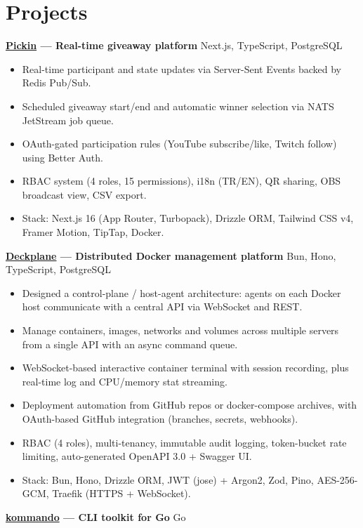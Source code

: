 \documentclass[10pt,a4paper]{extarticle}
\begin{document}
\section{Projects}
\noindent\textbf{\href{https://pickin.co}{Pickin} — Real-time giveaway platform} \hfill Next.js, TypeScript, PostgreSQL\\
\begin{itemize}[leftmargin=*,noitemsep,topsep=0pt]
    \item Real-time participant and state updates via Server-Sent Events backed by Redis Pub/Sub.
    \item Scheduled giveaway start/end and automatic winner selection via NATS JetStream job queue.
    \item OAuth-gated participation rules (YouTube subscribe/like, Twitch follow) using Better Auth.
    \item RBAC system (4 roles, 15 permissions), i18n (TR/EN), QR sharing, OBS broadcast view, CSV export.
    \item Stack: Next.js 16 (App Router, Turbopack), Drizzle ORM, Tailwind CSS v4, Framer Motion, TipTap, Docker.
\end{itemize}
\noindent\textbf{\href{https://deckplane.com}{Deckplane} — Distributed Docker management platform} \hfill Bun, Hono, TypeScript, PostgreSQL\\
\begin{itemize}[leftmargin=*,noitemsep,topsep=0pt]
    \item Designed a control-plane / host-agent architecture: agents on each Docker host communicate with a central API via WebSocket and REST.
    \item Manage containers, images, networks and volumes across multiple servers from a single API with an async command queue.
    \item WebSocket-based interactive container terminal with session recording, plus real-time log and CPU/memory stat streaming.
    \item Deployment automation from GitHub repos or docker-compose archives, with OAuth-based GitHub integration (branches, secrets, webhooks).
    \item RBAC (4 roles), multi-tenancy, immutable audit logging, token-bucket rate limiting, auto-generated OpenAPI 3.0 + Swagger UI.
    \item Stack: Bun, Hono, Drizzle ORM, JWT (jose) + Argon2, Zod, Pino, AES-256-GCM, Traefik (HTTPS + WebSocket).
\end{itemize}
\noindent\textbf{\href{https://github.com/yigit433/kommando}{kommando} — CLI toolkit for Go} \hfill Go\\
\end{document}
